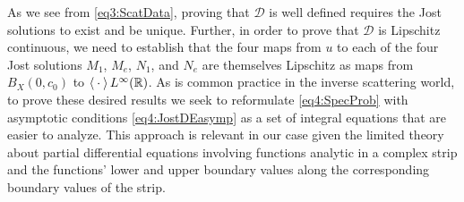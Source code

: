 \documentclass[../dissertation.tex]{subfiles}
\begin{document}
As we see from \eqref{eq3:ScatData}, proving that $\mathscr D$ is well defined 
requires the Jost solutions to exist and be unique. Further, in order to prove 
that $\mathscr D$ is Lipschitz continuous, we need to establish that 
the four maps from $u$ to each of the four Jost solutions $M_1$, $M_e$, $N_1$, 
and $N_e$ are themselves Lipschitz as maps from $B_X(0, c_0)$ to 
$\left\langle \kern 0.5ex \cdot \kern 0.5ex \right\rangle L^\infty(\mathbb R)$. As is common practice in the inverse 
scattering world, to prove these desired results we seek to reformulate 
\eqref{eq4:SpecProb} with asymptotic conditions \eqref{eq4:JostDEasymp} as a set 
of integral equations that are easier to analyze. This approach is relevant in 
our case given the limited theory about partial differential equations 
involving functions analytic in a complex strip and the functions' lower and 
upper boundary values along the corresponding boundary values of the strip.
\end{document}
